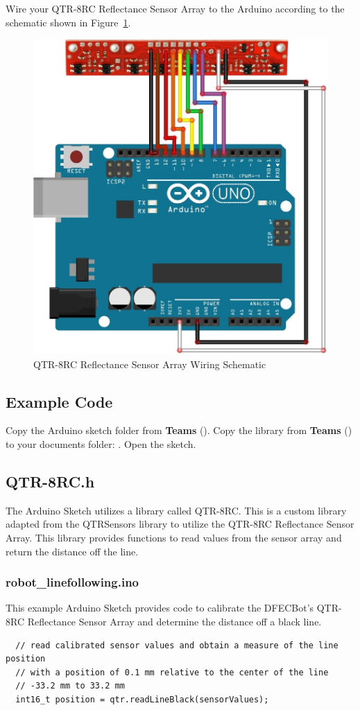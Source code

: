 \documentclass{handout}
\begin{document}
	Wire your QTR-8RC Reflectance Sensor Array to the Arduino according to the schematic shown in Figure~\ref{Fig Line}.
	
	\begin{figure} [H]
		\centering
		\includegraphics[width=.5\textwidth]{line.jpg}
		\caption{QTR-8RC Reflectance Sensor Array Wiring Schematic}
		\label{Fig Line}
	\end{figure}
	
	\subsection{Example Code}
	Copy the Arduino sketch folder   from \textbf{Teams} (). Copy the  library from \textbf{Teams} () to your documents folder: . Open the  sketch.
	
	\subsection{QTR-8RC.h}
	The Arduino Sketch utilizes a library called QTR-8RC. This is a custom library adapted from the QTRSensors library to utilize the QTR-8RC Reflectance Sensor Array. This library provides functions to read values from the sensor array and return the distance off the line.
	
	\subsubsection{robot\_linefollowing.ino}
	This example Arduino Sketch provides code to calibrate the DFECBot's QTR-8RC Reflectance Sensor Array and determine the distance off a black line.
	
	\begin{lstlisting}
  // read calibrated sensor values and obtain a measure of the line position
  // with a position of 0.1 mm relative to the center of the line 
  // -33.2 mm to 33.2 mm
  int16_t position = qtr.readLineBlack(sensorValues);
	\end{lstlisting}
	
\end{document}

